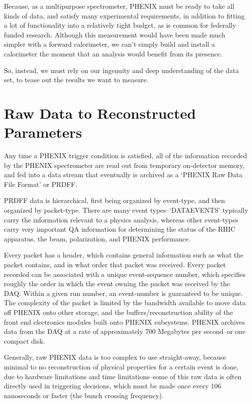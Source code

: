 Because, as a multipurpose spectrometer, PHENIX must be ready to take
all kinds of data, and satisfy many experimental requirements, in addition to
fitting a lot of functionality into a relatively tight budget, as is common for
federally funded research. Although this measurement would have been made
much simpler with a forward calorimeter, we can't simply build and install a
calorimeter the moment that an analysis would benefit from its presence.

So, instead, we must rely on our ingenuity and deep understanding of the data
set, to tease out the results we want to measure.

\section{Raw Data to Reconstructed Parameters}

Any time a PHENIX trigger condition is satisfied, all of the information
recorded by the PHENIX spectrometer are read out from temporary on-detector
memory, and fed into a data stream that eventually is archived as a `PHENIX Raw
Data File Format' or PRDFF. 

PRDFF data is hierarchical, first being organized by event-type, and
then organized by packet-type.  There are many event types--`DATAEVENTS'
typically carry the information relevant to a physics analysis, whereas other
event-types carry very important QA information for determining the status of
the RHIC apparatus, the beam, polarization, and PHENIX performance.

Every packet has a header, which contains general information such as what the
packet contains, and in what order that packet was received. Every packet
recorded can be associated with a unique event-sequence number, which specifies
roughly the order in which the event owning the packet was received by the DAQ.
Within a given run number, an event-number is guaranteed to be unique. The
complexity of the packet is limited by the bandwidth available to move data off
PHENIX onto other storage, and the buffers/reconstruction ability of the front
end electronics modules built onto PHENIX subsystems. PHENIX archives data from
the DAQ at a rate of approximately 700 Megabytes per second--or one compact
disk.

Generally, raw PHENIX data is too complex to use straight-away, because minimal
to no reconstruction of physical properties for a certain event is done, due to
hardware limitations and time limitations--some of this raw data is often
directly used in triggering decisions, which must be made once every 106
nanoseconds or faster (the bunch crossing frequency).

